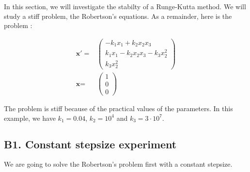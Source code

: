 In this section, we will investigate the stabilty of a Runge-Kutta method. We will study a stiff problem, the Robertson's equations. As a remainder, here is the problem : 

\begin{eqnarray*}
\textbf{x}' =& \left( \begin{array}{c}
-k_1x_1+k_2x_2x_3 \\ 
k_1x_1-k_2x_2x_3-k_3x_2^2 \\ 
k_3x_2^2 
\end{array} \right) \\
\textbf{x} =& \left( \begin{array}{c}
1 \\ 
0 \\ 
0 
\end{array} \right)
\end{eqnarray*}

The problem is stiff because of the practical values of the parameters. In this example, we have $k_1=0.04$, $k_2=10^4$ and $k_3=3 \cdot 10^7$.

\subsection*{B1. Constant stepsize experiment}
We are going to solve the Robertson's problem first with a constant stepsize.